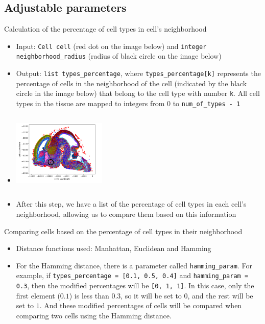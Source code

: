 \documentclass{beamer}
\begin{document}
\subsection{Adjustable parameters}
\begin{frame}{Calculation of the percentage of cell types in cell's neighborhood}

\begin{itemize}
    \item <1->Input: \texttt{Cell cell} (red dot on the image below) and \texttt{integer neighborhood\_radius} (radius of black circle on the image below)
    \item<2-> Output: \texttt{list types\_percentage}, where \texttt{types\_percentage[k]} represents the percentage of cells in the neighborhood of the cell (indicated by the black circle in the image below) that belong to the cell type with number \texttt{k}. All cell types in the tissue are mapped to integers from $0$ to \texttt{num\_of\_types - 1}
    \item<3-> []
    \begin{columns}
        \begin{column}{0.9\textwidth} %
          \includegraphics[width=0.35\textwidth]{radius.png}
          \caption{Neighborhood of cell}
        \end{column}
    \end{columns}
    \item<4-> After this step, we have a list of the percentage of cell types in each cell's neighborhood, allowing us to compare them based on this information
\end{itemize}

\end{frame}
\begin{frame}{Comparing cells based on the percentage of cell types in their neighborhood}

\begin{itemize}
    \item<1-> Distance functions used: Manhattan, Euclidean and Hamming
    \item<2-> For the Hamming distance, there is a parameter called \texttt{hamming\_param}. For example, if \texttt{types\_percentage = [0.1, 0.5, 0.4]} and \texttt{hamming\_param = 0.3}, then the modified percentages will be \texttt{[0, 1, 1]}. In this case, only the first element ($0.1$) is less than $0.3$, so it will be set to $0$, and the rest will be set to $1$. And these modified percentages of cells will be compared when comparing two cells using the Hamming distance.
\end{itemize}

\end{frame}
\end{document}
